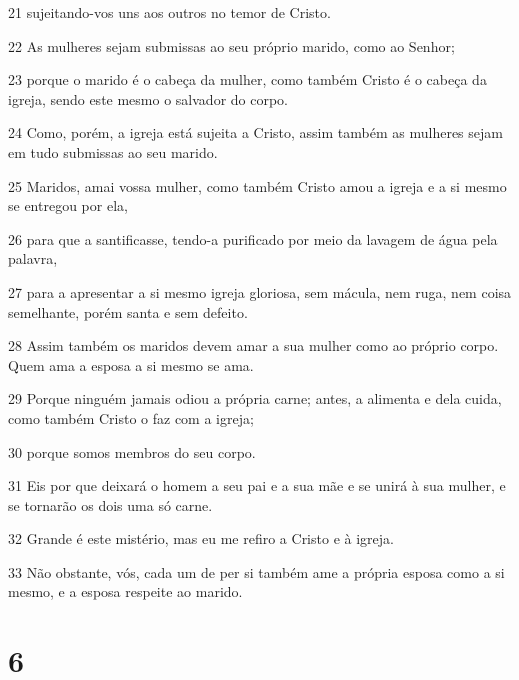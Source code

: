 \par 21 sujeitando-vos uns aos outros no temor de Cristo.
\par 22 As mulheres sejam submissas ao seu próprio marido, como ao Senhor;
\par 23 porque o marido é o cabeça da mulher, como também Cristo é o cabeça da igreja, sendo este mesmo o salvador do corpo.
\par 24 Como, porém, a igreja está sujeita a Cristo, assim também as mulheres sejam em tudo submissas ao seu marido.
\par 25 Maridos, amai vossa mulher, como também Cristo amou a igreja e a si mesmo se entregou por ela,
\par 26 para que a santificasse, tendo-a purificado por meio da lavagem de água pela palavra,
\par 27 para a apresentar a si mesmo igreja gloriosa, sem mácula, nem ruga, nem coisa semelhante, porém santa e sem defeito.
\par 28 Assim também os maridos devem amar a sua mulher como ao próprio corpo. Quem ama a esposa a si mesmo se ama.
\par 29 Porque ninguém jamais odiou a própria carne; antes, a alimenta e dela cuida, como também Cristo o faz com a igreja;
\par 30 porque somos membros do seu corpo.
\par 31 Eis por que deixará o homem a seu pai e a sua mãe e se unirá à sua mulher, e se tornarão os dois uma só carne.
\par 32 Grande é este mistério, mas eu me refiro a Cristo e à igreja.
\par 33 Não obstante, vós, cada um de per si também ame a própria esposa como a si mesmo, e a esposa respeite ao marido.

\chapter{6}

